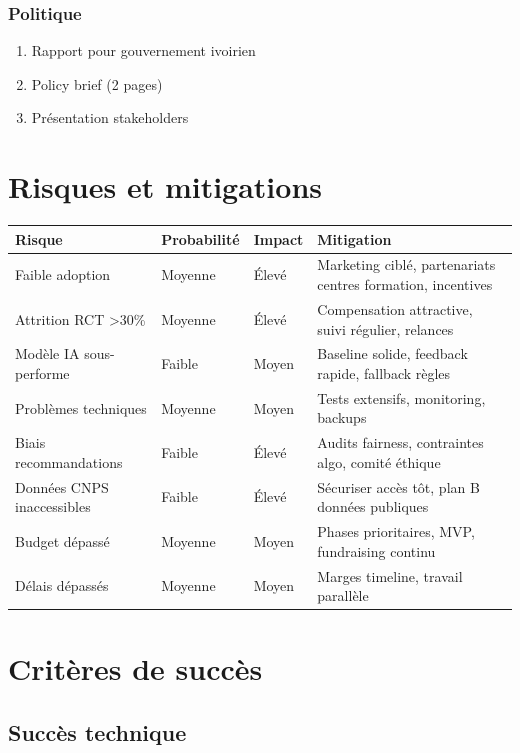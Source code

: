 \documentclass[12pt]{article}
\begin{document}
\subsubsection{Politique}

\begin{enumerate}
    \item Rapport pour gouvernement ivoirien
    \item Policy brief (2 pages)
    \item Présentation stakeholders
\end{enumerate}

\section{Risques et mitigations}

\begin{table}[h]
\centering
\small
\begin{tabular}{p{3.5cm}p{2cm}p{1.5cm}p{5cm}}
\toprule
\textbf{Risque} & \textbf{Probabilité} & \textbf{Impact} & \textbf{Mitigation} \\
\midrule
Faible adoption & Moyenne & Élevé & Marketing ciblé, partenariats centres formation, incentives \\
Attrition RCT >30\% & Moyenne & Élevé & Compensation attractive, suivi régulier, relances \\
Modèle IA sous-performe & Faible & Moyen & Baseline solide, feedback rapide, fallback règles \\
Problèmes techniques & Moyenne & Moyen & Tests extensifs, monitoring, backups \\
Biais recommandations & Faible & Élevé & Audits fairness, contraintes algo, comité éthique \\
Données CNPS inaccessibles & Faible & Élevé & Sécuriser accès tôt, plan B données publiques \\
Budget dépassé & Moyenne & Moyen & Phases prioritaires, MVP, fundraising continu \\
Délais dépassés & Moyenne & Moyen & Marges timeline, travail parallèle \\
\bottomrule
\end{tabular}
\end{table}

\section{Critères de succès}

\subsection{Succès technique}
\end{document}
